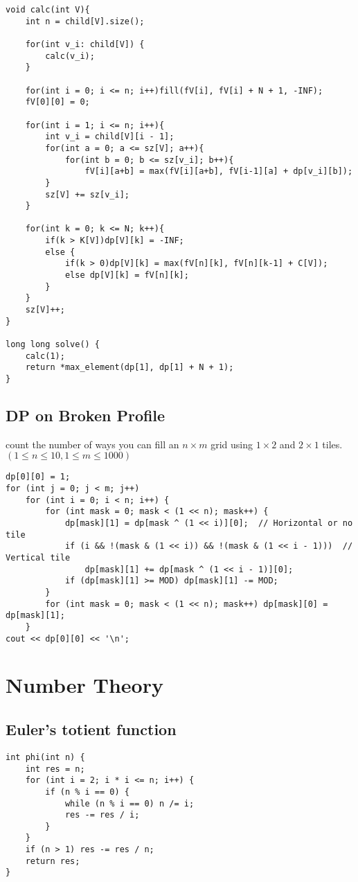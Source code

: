 \documentclass[11pt,a4paper]{article}
\begin{document}
\begin{multicols*}{2}
\begin{lstlisting}
void calc(int V){
    int n = child[V].size();

    for(int v_i: child[V]) {
        calc(v_i);
    }

    for(int i = 0; i <= n; i++)fill(fV[i], fV[i] + N + 1, -INF);    
    fV[0][0] = 0;                                                   

    for(int i = 1; i <= n; i++){
        int v_i = child[V][i - 1];
        for(int a = 0; a <= sz[V]; a++){        
            for(int b = 0; b <= sz[v_i]; b++){
                fV[i][a+b] = max(fV[i][a+b], fV[i-1][a] + dp[v_i][b]);  
        }
        sz[V] += sz[v_i];
    }

    for(int k = 0; k <= N; k++){
        if(k > K[V])dp[V][k] = -INF;                                
        else {                                                      
            if(k > 0)dp[V][k] = max(fV[n][k], fV[n][k-1] + C[V]);   
            else dp[V][k] = fV[n][k];                               
        }
    }
    sz[V]++;
}

long long solve() {
    calc(1);
    return *max_element(dp[1], dp[1] + N + 1);
}
\end{lstlisting}

\subsection{DP on Broken Profile}
count the number of ways you can fill an $n \times m$ grid using $1 \times 2$ and $2 \times 1$ tiles.
$(1 \le n \le 10, 1 \le m \le 1000)$
\begin{lstlisting}
dp[0][0] = 1;
for (int j = 0; j < m; j++)
    for (int i = 0; i < n; i++) {
        for (int mask = 0; mask < (1 << n); mask++) {
            dp[mask][1] = dp[mask ^ (1 << i)][0];  // Horizontal or no tile
            if (i && !(mask & (1 << i)) && !(mask & (1 << i - 1)))  // Vertical tile
                dp[mask][1] += dp[mask ^ (1 << i - 1)][0];
            if (dp[mask][1] >= MOD) dp[mask][1] -= MOD;
        }
        for (int mask = 0; mask < (1 << n); mask++) dp[mask][0] = dp[mask][1];
    }
cout << dp[0][0] << '\n';
\end{lstlisting}

\section{Number Theory}
\subsection{Euler's totient function}
\begin{lstlisting}
int phi(int n) {
    int res = n;
    for (int i = 2; i * i <= n; i++) {
        if (n % i == 0) {
            while (n % i == 0) n /= i;
            res -= res / i;
        }
    }
    if (n > 1) res -= res / n;
    return res;
}
\end{lstlisting}


\end{multicols*}
\end{document}
